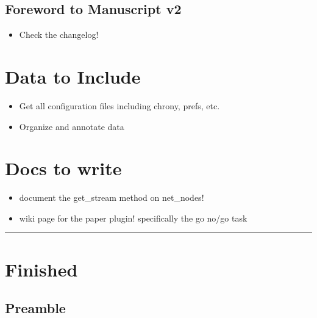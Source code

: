 \subsection{Foreword to Manuscript v2}

\begin{itemize}
\item Check the changelog!
\end{itemize}


\section{Data to Include}

\begin{itemize}
\item Get all configuration files including chrony, prefs, etc.
\item Organize and annotate data
\end{itemize}

\section{Docs to write}

\begin{itemize}
\item document the get\_stream method on net\_nodes!
\item wiki page for the paper plugin! specifically the go no/go task
\end{itemize}


\hrule

\section{Finished}


\subsection{Preamble}

